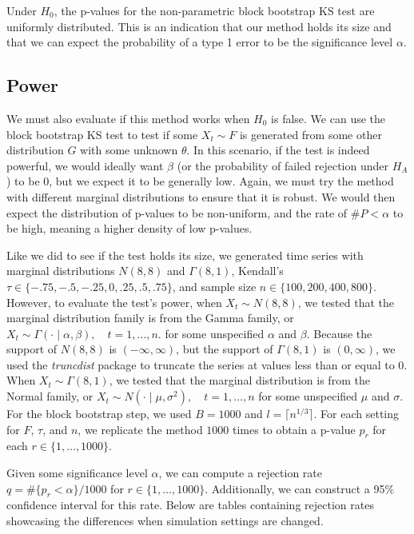 \documentclass[12pt, titlepage, letterpaper]{article}
\begin{document}
{Under $H_0$, the p-values for the non-parametric block bootstrap KS test are
uniformly distributed. This is an indication that our method 
holds its size and that we can expect the probability
of a type 1 error to be the significance level $\alpha$.


\subsection{Power}
We must also evaluate if this method works when $H_0$ is false. We can use
the block bootstrap KS test to test if some $X_t \sim F$ is generated from 
some other 
distribution $G$ with some unknown $\theta$. In this scenario, if the test is 
indeed powerful,
we would ideally want $\beta$ 
(or the probability of failed rejection under $H_A$) 
to be 0, but we
expect it to be generally low. Again, we must try the method with different
marginal distributions to ensure that it is robust.
We would then expect the distribution of p-values to be non-uniform, and the 
rate
of $\#P < \alpha$ to be high, meaning a higher density of low p-values.


Like we did to see if the test holds its size, we generated time series with 
marginal distributions $N(8, 8)$ and 
$\Gamma(8, 1)$, Kendall's $\tau \in \{-.75, -.5, -.25, 0, .25, .5, 
.75\}$, and
sample size $n \in \{100, 200, 400, 800\}$. However, 
to evaluate the test's power, when $X_t \sim N(8, 8)$, we tested
that the marginal distribution family is from the Gamma family,
or
$X_t \sim \Gamma(\cdot \mid \alpha, \beta), \quad t = 1, \ldots, n$.
for some unspecified $\alpha$ and $\beta$. Because the support of $N(8, 8)$ is
$(-\infty, \infty)$, but the support of $\Gamma(8, 1)$ is $(0, \infty)$, we used
the \textsl{truncdist} package \citep{truncdist} to truncate the series at 
values less than or equal to 0.
When $X_t \sim \Gamma(8, 1)$, we tested that the 
marginal distribution is from the
Normal family, or 
$X_t \sim N(\cdot \mid \mu, \sigma^2), \quad t = 1, \ldots, n$
for some unspecified $\mu$ and $\sigma$. For the block bootstrap step,
we used $B = 1000$ and $l = \lceil n^{1/3} \rceil$.
For each setting for $F$, $\tau$, and $n$, we replicate the method $1000$ times 
to obtain a p-value $p_r$ for each $r \in \{1, \ldots, 1000\}$.


Given some significance level $\alpha$, we can compute a rejection rate 
$q = \#\{p_r < \alpha\} / 1000$ for $r \in \{1, \ldots, 1000\}$.
Additionally, we can construct a 95\% confidence interval for 
this rate. Below are tables containing rejection rates showcasing the 
differences when simulation settings are changed.

}
\end{document}
